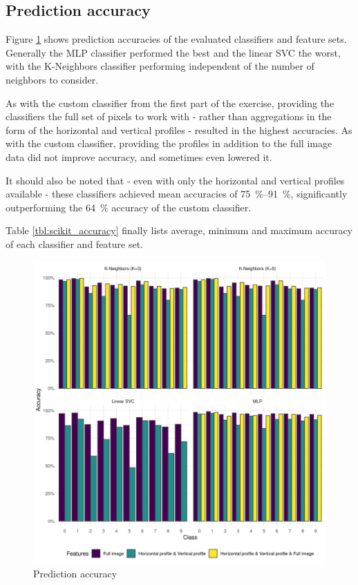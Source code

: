 \documentclass[a4paper]{scrreprt}
\begin{document}
\subsection{Prediction accuracy}

Figure \ref{fig:scikit_accuracy} shows prediction accuracies of the evaluated
classifiers and feature sets. Generally the MLP classifier performed the best
and the linear SVC the worst, with the K-Neighbors classifier performing
independent of the number of neighbors to consider.

As with the custom classifier from the first part of the exercise, providing
the classifiers the full set of pixels to work with - rather than aggregations
in the form of the horizontal and vertical profiles - resulted in the highest
accuracies. As with the custom classifier, providing the profiles in addition
to the full image data did not improve accuracy, and sometimes even lowered it.

It should also be noted that - even with only the horizontal and vertical
profiles available - these classifiers achieved mean accuracies of
\SIrange{75}{91}{\percent}, significantly outperforming the \SI{64}{\percent}
accuracy of the custom classifier.

Table \ref{tbl:scikit_accuracy} finally lists average, minimum and maximum
accuracy of each classifier and feature set.

\begin{figure}[h]
        \centering
		\includegraphics[width=\textwidth]{../resources/scikit_overview.png}
		\caption{Prediction accuracy}
		\label{fig:scikit_accuracy}
\end{figure}
\end{document}
